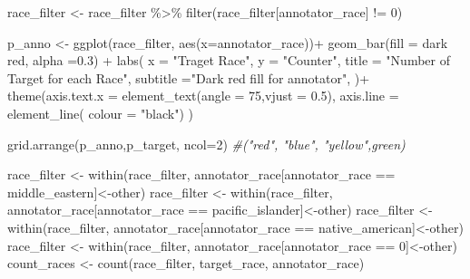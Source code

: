 \documentclass[
]{article}
\newenvironment{Shaded}{\begin{snugshade}}{\end{snugshade}}
\newcommand{\AttributeTok}[1]{\textcolor[rgb]{0.77,0.63,0.00}{#1}}
\newcommand{\CommentTok}[1]{\textcolor[rgb]{0.56,0.35,0.01}{\textit{#1}}}
\newcommand{\DecValTok}[1]{\textcolor[rgb]{0.00,0.00,0.81}{#1}}
\newcommand{\FloatTok}[1]{\textcolor[rgb]{0.00,0.00,0.81}{#1}}
\newcommand{\FunctionTok}[1]{\textcolor[rgb]{0.00,0.00,0.00}{#1}}
\newcommand{\NormalTok}[1]{#1}
\newcommand{\OtherTok}[1]{\textcolor[rgb]{0.56,0.35,0.01}{#1}}
\newcommand{\SpecialCharTok}[1]{\textcolor[rgb]{0.00,0.00,0.00}{#1}}
\newcommand{\StringTok}[1]{\textcolor[rgb]{0.31,0.60,0.02}{#1}}
\begin{document}
\begin{Shaded}
\begin{Highlighting}[]
\NormalTok{race\_filter }\OtherTok{\textless{}{-}}\NormalTok{ race\_filter }\SpecialCharTok{\%\textgreater{}\%} \FunctionTok{filter}\NormalTok{(race\_filter[}\StringTok{\textquotesingle{}annotator\_race\textquotesingle{}}\NormalTok{] }\SpecialCharTok{!=} \DecValTok{0}\NormalTok{)}

\NormalTok{p\_anno }\OtherTok{\textless{}{-}} \FunctionTok{ggplot}\NormalTok{(race\_filter, }\FunctionTok{aes}\NormalTok{(}\AttributeTok{x=}\NormalTok{annotator\_race))}\SpecialCharTok{+}
  \FunctionTok{geom\_bar}\NormalTok{(}\AttributeTok{fill =} \StringTok{\textquotesingle{}dark red\textquotesingle{}}\NormalTok{, }\AttributeTok{alpha =}\FloatTok{0.3}\NormalTok{) }\SpecialCharTok{+}
  \FunctionTok{labs}\NormalTok{(}
    \AttributeTok{x =} \StringTok{"Traget Race"}\NormalTok{,}
    \AttributeTok{y =} \StringTok{"Counter"}\NormalTok{,}
    \AttributeTok{title =} \StringTok{"Number of Target for each Race"}\NormalTok{,}
    \AttributeTok{subtitle =}\StringTok{"Dark red fill for annotator"}\NormalTok{,}
\NormalTok{  )}\SpecialCharTok{+}
  \FunctionTok{theme}\NormalTok{(}\AttributeTok{axis.text.x =} \FunctionTok{element\_text}\NormalTok{(}\AttributeTok{angle =} \DecValTok{75}\NormalTok{,}\AttributeTok{vjust =} \FloatTok{0.5}\NormalTok{),}
        \AttributeTok{axis.line =} \FunctionTok{element\_line}\NormalTok{( }\AttributeTok{colour =} \StringTok{"black"}\NormalTok{)}
\NormalTok{  )}

\FunctionTok{grid.arrange}\NormalTok{(p\_anno,p\_target, }\AttributeTok{ncol=}\DecValTok{2}\NormalTok{)}
\CommentTok{\#("red", "blue", "yellow",\textquotesingle{}green\textquotesingle{})}

\NormalTok{race\_filter }\OtherTok{\textless{}{-}} \FunctionTok{within}\NormalTok{(race\_filter, annotator\_race[annotator\_race }\SpecialCharTok{==} \StringTok{\textquotesingle{}middle\_eastern\textquotesingle{}}\NormalTok{]}\OtherTok{\textless{}{-}}\StringTok{\textquotesingle{}other\textquotesingle{}}\NormalTok{)}
\NormalTok{race\_filter }\OtherTok{\textless{}{-}} \FunctionTok{within}\NormalTok{(race\_filter, annotator\_race[annotator\_race }\SpecialCharTok{==} \StringTok{\textquotesingle{}pacific\_islander\textquotesingle{}}\NormalTok{]}\OtherTok{\textless{}{-}}\StringTok{\textquotesingle{}other\textquotesingle{}}\NormalTok{)}
\NormalTok{race\_filter }\OtherTok{\textless{}{-}} \FunctionTok{within}\NormalTok{(race\_filter, annotator\_race[annotator\_race }\SpecialCharTok{==} \StringTok{\textquotesingle{}native\_american\textquotesingle{}}\NormalTok{]}\OtherTok{\textless{}{-}}\StringTok{\textquotesingle{}other\textquotesingle{}}\NormalTok{)}
\NormalTok{race\_filter }\OtherTok{\textless{}{-}} \FunctionTok{within}\NormalTok{(race\_filter, annotator\_race[annotator\_race }\SpecialCharTok{==} \StringTok{\textquotesingle{}0\textquotesingle{}}\NormalTok{]}\OtherTok{\textless{}{-}}\StringTok{\textquotesingle{}other\textquotesingle{}}\NormalTok{)}
\NormalTok{count\_races }\OtherTok{\textless{}{-}} \FunctionTok{count}\NormalTok{(race\_filter, target\_race, annotator\_race)}



\end{Highlighting}
\end{Shaded}
\end{document}
